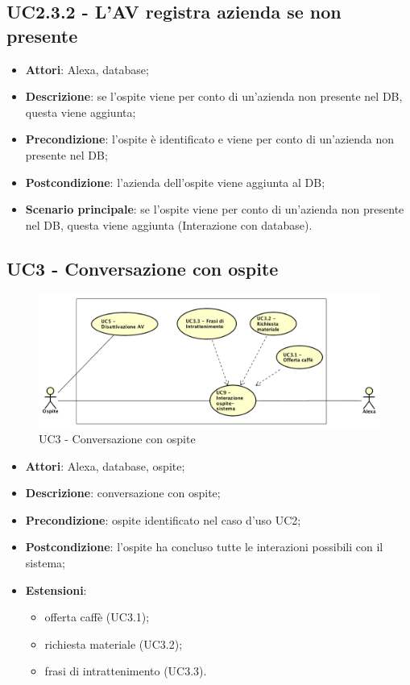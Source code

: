\documentclass[../AnalisiDeiRequisiti.tex]{subfiles}
\begin{document}
\subsection{UC2.3.2 - L'AV registra azienda se non presente} 
\label{sssec:UC2.3.2} 
\begin{itemize} 
\item \textbf{Attori}: Alexa, database;
\item \textbf{Descrizione}: se l'ospite viene per conto di un'azienda non presente nel DB, questa viene aggiunta;
\item \textbf{Precondizione}: l'ospite è identificato e viene per conto di un'azienda non presente nel DB;
\item \textbf{Postcondizione}: l'azienda dell'ospite viene aggiunta al DB;
\item \textbf{Scenario principale}: se l'ospite viene per conto di un'azienda non presente nel DB, questa viene aggiunta (Interazione con database).\end{itemize} 
\newpage
\subsection{UC3 - Conversazione con ospite}
\begin{figure}[!h]
	\centering
	\includegraphics[width=\textwidth]{UseCases/UC3-Conversazione/UC3.png}
	\caption{UC3 - Conversazione con ospite}
\end{figure}
\label{sssec:UC3}
\begin{itemize} 
\item \textbf{Attori}: Alexa, database, ospite;
\item \textbf{Descrizione}: conversazione con ospite;
\item \textbf{Precondizione}: ospite identificato nel caso d'uso UC2;
\item \textbf{Postcondizione}: l'ospite ha concluso tutte le interazioni possibili con il sistema;
\item \textbf{Estensioni}:\begin{itemize}\item offerta caffè (UC3.1);\item richiesta materiale (UC3.2);\item frasi di intrattenimento (UC3.3).\end{itemize}
\end{itemize} 
\end{document}
